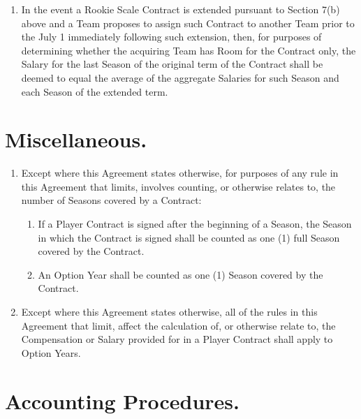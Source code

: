 \documentclass[
]{book}
\providecommand{\tightlist}{%
  \setlength{\itemsep}{0pt}\setlength{\parskip}{0pt}}
\begin{document}
\begin{enumerate}
\item
  In the event a Rookie Scale Contract is extended pursuant to Section 7(b) above and a Team proposes to assign such Contract to another Team prior to the July 1 immediately following such extension, then, for purposes of determining whether the acquiring Team has Room for the Contract only, the Salary for the last Season of the original term of the Contract shall be deemed to equal the average of the aggregate Salaries for such Season and each Season of the extended term.
\end{enumerate}

\hypertarget{miscellaneous.}{%
\section{Miscellaneous.}\label{miscellaneous.}}

\begin{enumerate}
\def\labelenumi{(\alph{enumi})}
\tightlist
\item
  Except where this Agreement states otherwise, for purposes of any rule in this Agreement that limits, involves counting, or otherwise relates to, the number of Seasons covered by a Contract:

  \begin{enumerate}
  \def\labelenumii{(\arabic{enumii})}
  \tightlist
  \item
    If a Player Contract is signed after the beginning of a Season, the Season in which the Contract is signed shall be counted as one (1) full Season covered by the Contract.
  \item
    An Option Year shall be counted as one (1) Season covered by the Contract.
  \end{enumerate}
\item
  Except where this Agreement states otherwise, all of the rules in this Agreement that limit, affect the calculation of, or otherwise relate to, the Compensation or Salary provided for in a Player Contract shall apply to Option Years.
\end{enumerate}

\hypertarget{accounting-procedures.}{%
\section{Accounting Procedures.}\label{accounting-procedures.}}
\end{document}
